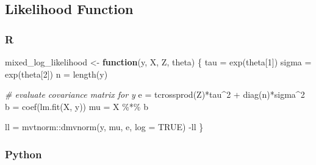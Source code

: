 \documentclass[
  letterpaper,
]{krantz}
\newenvironment{Shaded}{}{}
\newcommand{\AttributeTok}[1]{\textcolor[rgb]{0.49,0.56,0.16}{#1}}
\newcommand{\CommentTok}[1]{\textcolor[rgb]{0.38,0.63,0.69}{\textit{#1}}}
\newcommand{\ConstantTok}[1]{\textcolor[rgb]{0.53,0.00,0.00}{#1}}
\newcommand{\ControlFlowTok}[1]{\textcolor[rgb]{0.00,0.44,0.13}{\textbf{#1}}}
\newcommand{\DecValTok}[1]{\textcolor[rgb]{0.25,0.63,0.44}{#1}}
\newcommand{\FunctionTok}[1]{\textcolor[rgb]{0.02,0.16,0.49}{#1}}
\newcommand{\NormalTok}[1]{#1}
\newcommand{\OtherTok}[1]{\textcolor[rgb]{0.00,0.44,0.13}{#1}}
\newcommand{\SpecialCharTok}[1]{\textcolor[rgb]{0.25,0.44,0.63}{#1}}
\begin{document}
\subsection{Likelihood Function}\label{likelihood-function}

\subsubsection{R}

\begin{Shaded}
\begin{Highlighting}[]
\NormalTok{mixed\_log\_likelihood }\OtherTok{\textless{}{-}} \ControlFlowTok{function}\NormalTok{(y, X, Z, theta) \{}
\NormalTok{  tau   }\OtherTok{=} \FunctionTok{exp}\NormalTok{(theta[}\DecValTok{1}\NormalTok{])}
\NormalTok{  sigma }\OtherTok{=} \FunctionTok{exp}\NormalTok{(theta[}\DecValTok{2}\NormalTok{])}
\NormalTok{  n }\OtherTok{=} \FunctionTok{length}\NormalTok{(y)}
  
  \CommentTok{\# evaluate covariance matrix for y}
\NormalTok{  e  }\OtherTok{=} \FunctionTok{tcrossprod}\NormalTok{(Z)}\SpecialCharTok{*}\NormalTok{tau}\SpecialCharTok{\^{}}\DecValTok{2} \SpecialCharTok{+} \FunctionTok{diag}\NormalTok{(n)}\SpecialCharTok{*}\NormalTok{sigma}\SpecialCharTok{\^{}}\DecValTok{2}
\NormalTok{  b  }\OtherTok{=} \FunctionTok{coef}\NormalTok{(}\FunctionTok{lm.fit}\NormalTok{(X, y))}
\NormalTok{  mu }\OtherTok{=}\NormalTok{ X }\SpecialCharTok{\%*\%}\NormalTok{ b}

\NormalTok{  ll }\OtherTok{=}\NormalTok{ mvtnorm}\SpecialCharTok{::}\FunctionTok{dmvnorm}\NormalTok{(y, mu, e, }\AttributeTok{log =} \ConstantTok{TRUE}\NormalTok{)}
  \SpecialCharTok{{-}}\NormalTok{ll}
\NormalTok{\}}
\end{Highlighting}
\end{Shaded}

\subsubsection{Python}
\end{document}
